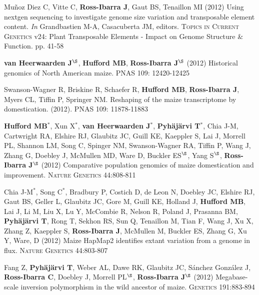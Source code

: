 \documentclass[letterpaper,10pt]{article}
\begin{document}
\begin{etaremune}
\item Mu\~{n}oz Diez C, Vitte C, {\bf Ross-Ibarra J}, Gaut BS, Tenaillon MI (2012) Using nextgen sequencing to investigate genome size variation and transposable element content. \emph{In} Grandbastien M-A, Casacuberta JM, editors. \textsc{Topics in Current Genetics} v24: Plant Transposable Elements - Impact on Genome Structure \& Function. pp. 41-58


\item  {\bf van Heerwaarden J}$^\S$, {\bf Hufford MB}, {\bf Ross-Ibarra J}$^\S$ (2012) Historical genomics of North American maize. \textsc{PNAS} 109: 12420-12425


\item Swanson-Wagner R, Briskine R, Schaefer R, {\bf Hufford MB}, {\bf Ross-Ibarra J}, Myers CL, Tiffin P, Springer NM.  Reshaping of the maize transcriptome by domestication. (2012). \textsc{PNAS}  109: 11878-11883


\item {\bf Hufford MB}$^*$, Xun X$^*$, {\bf van Heerwaarden J}$^*$, {\bf Pyh\"aj\"arvi T}$^*$, Chia J-M, Cartwright RA, Elshire RJ, Glaubitz JC, Guill KE, Kaeppler S, Lai J, Morrell PL, Shannon LM, Song C, Spinger NM, Swanson-Wagner RA, Tiffin P, Wang J, Zhang G, Doebley J, McMullen MD, Ware D, Buckler ES$^\S$, Yang S$^\S$, {\bf Ross-Ibarra J}$^\S$ (2012) Comparative population genomics of maize domestication and improvement. \textsc{Nature Genetics} 44:808-811 %


\item  Chia J-M$^*$, Song C$^*$, Bradbury P, Costich D, de Leon N, Doebley JC, Elshire RJ, Gaut BS, Geller L, Glaubitz JC, Gore M, Guill KE, Holland J,  {\bf Hufford MB}, Lai J, Li M, Liu X, Lu Y, McCombie R, Nelson R, Poland J, Prasanna BM,  {\bf Pyh\"aj\"arvi T}, Rong T, Sekhon RS,  Sun Q, Tenaillon M, Tian F, Wang J, Xu X, Zhang Z, Kaeppler S, {\bf Ross-Ibarra J}, McMullen M, Buckler ES, Zhang G, Xu Y, Ware, D (2012) Maize HapMap2 identifies extant variation from a genome in flux. \textsc{Nature Genetics} 44:803-807 %


\item Fang Z, {\bf Pyh\"aj\"arvi T}, Weber AL, Dawe RK, Glaubitz JC, S\'{a}nchez Gonz\'{a}lez J, {\bf Ross-Ibarra C}, Doebley J, Morrell PL$^\S$, {\bf Ross-Ibarra J}$^\S$  (2012) Megabase-scale inversion polymorphism in the wild ancestor of maize. \textsc{Genetics} 191:883-894



\end{etaremune}
\end{document}
